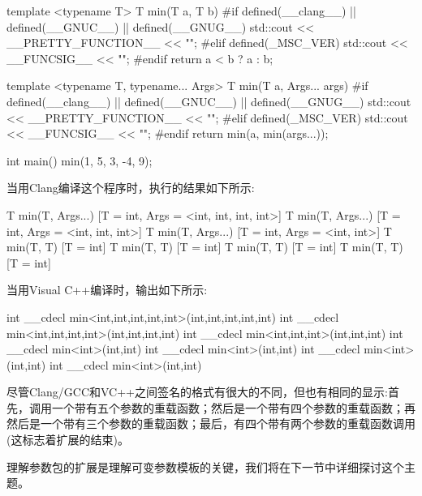\begin{cpp}
template <typename T>
T min(T a, T b)
{
#if defined(__clang__) || defined(__GNUC__) || defined(__GNUG__)
	std::cout << __PRETTY_FUNCTION__ << "\n";
#elif defined(_MSC_VER)
	std::cout << __FUNCSIG__ << "\n";
#endif
	return a < b ? a : b;
}

template <typename T, typename... Args>
T min(T a, Args... args)
{
#if defined(__clang__) || defined(__GNUC__) || defined(__GNUG__)
	std::cout << __PRETTY_FUNCTION__ << "\n";
#elif defined(_MSC_VER)
	std::cout << __FUNCSIG__ << "\n";
#endif
	return min(a, min(args...));
}

int main()
{
	min(1, 5, 3, -4, 9);
}
\end{cpp}

当用Clang编译这个程序时，执行的结果如下所示:

\begin{cpp}
T min(T, Args...) [T = int, Args = <int, int, int, int>]
T min(T, Args...) [T = int, Args = <int, int, int>]
T min(T, Args...) [T = int, Args = <int, int>]
T min(T, T) [T = int]
T min(T, T) [T = int]
T min(T, T) [T = int]
T min(T, T) [T = int]
\end{cpp}

当用Visual C++编译时，输出如下所示:

\begin{cpp}
int __cdecl min<int,int,int,int,int>(int,int,int,int,int)
int __cdecl min<int,int,int,int>(int,int,int,int)
int __cdecl min<int,int,int>(int,int,int)
int __cdecl min<int>(int,int)
int __cdecl min<int>(int,int)
int __cdecl min<int>(int,int)
int __cdecl min<int>(int,int)
\end{cpp}

尽管Clang/GCC和VC++之间签名的格式有很大的不同，但也有相同的显示:首先，调用一个带有五个参数的重载函数；然后是一个带有四个参数的重载函数；再然后是一个带有三个参数的重载函数；最后，有四个带有两个参数的重载函数调用(这标志着扩展的结束)。

理解参数包的扩展是理解可变参数模板的关键，我们将在下一节中详细探讨这个主题。



